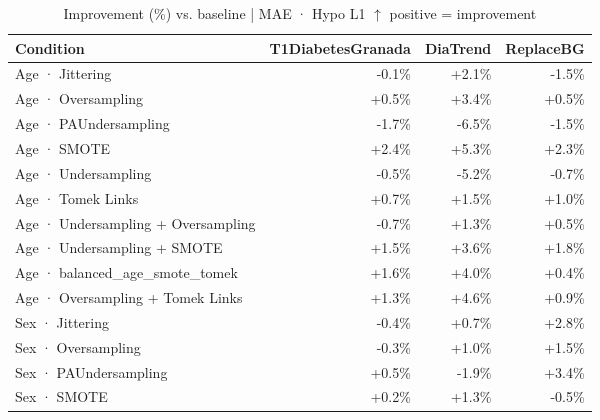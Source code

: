 \begin{table}[htbp]
\centering
\small
\caption{Improvement (\%) vs. baseline  |  MAE · Hypo L1  $\uparrow$ positive = improvement}
\label{tab:delta_mae_tbr_1}
\begin{tabular}{lrrr}
\toprule
\textbf{Condition} & \textbf{T1DiabetesGranada} & \textbf{DiaTrend} & \textbf{ReplaceBG} \\
\midrule
Age · Jittering & \textcolor{BrickRed}{-0.1\%} & \textcolor{OliveGreen}{+2.1\%} & \textcolor{BrickRed}{-1.5\%} \\
Age · Oversampling & \textcolor{OliveGreen}{+0.5\%} & \textcolor{OliveGreen}{+3.4\%} & \textcolor{OliveGreen}{+0.5\%} \\
Age · PAUndersampling & \textcolor{BrickRed}{-1.7\%} & \textcolor{BrickRed}{-6.5\%} & \textcolor{BrickRed}{-1.5\%} \\
Age · SMOTE & \textcolor{OliveGreen}{+2.4\%} & \textcolor{OliveGreen}{+5.3\%} & \textcolor{OliveGreen}{+2.3\%} \\
Age · Undersampling & \textcolor{BrickRed}{-0.5\%} & \textcolor{BrickRed}{-5.2\%} & \textcolor{BrickRed}{-0.7\%} \\
Age · Tomek Links & \textcolor{OliveGreen}{+0.7\%} & \textcolor{OliveGreen}{+1.5\%} & \textcolor{OliveGreen}{+1.0\%} \\
Age · Undersampling + Oversampling & \textcolor{BrickRed}{-0.7\%} & \textcolor{OliveGreen}{+1.3\%} & \textcolor{OliveGreen}{+0.5\%} \\
Age · Undersampling + SMOTE & \textcolor{OliveGreen}{+1.5\%} & \textcolor{OliveGreen}{+3.6\%} & \textcolor{OliveGreen}{+1.8\%} \\
Age · balanced_age_smote_tomek & \textcolor{OliveGreen}{+1.6\%} & \textcolor{OliveGreen}{+4.0\%} & \textcolor{OliveGreen}{+0.4\%} \\
Age · Oversampling + Tomek Links & \textcolor{OliveGreen}{+1.3\%} & \textcolor{OliveGreen}{+4.6\%} & \textcolor{OliveGreen}{+0.9\%} \\
\midrule
Sex · Jittering & \textcolor{BrickRed}{-0.4\%} & \textcolor{OliveGreen}{+0.7\%} & \textcolor{OliveGreen}{+2.8\%} \\
Sex · Oversampling & \textcolor{BrickRed}{-0.3\%} & \textcolor{OliveGreen}{+1.0\%} & \textcolor{OliveGreen}{+1.5\%} \\
Sex · PAUndersampling & \textcolor{OliveGreen}{+0.5\%} & \textcolor{BrickRed}{-1.9\%} & \textcolor{OliveGreen}{+3.4\%} \\
Sex · SMOTE & \textcolor{OliveGreen}{+0.2\%} & \textcolor{OliveGreen}{+1.3\%} & \textcolor{BrickRed}{-0.5\%} \\

\end{tabular}
\end{table}
